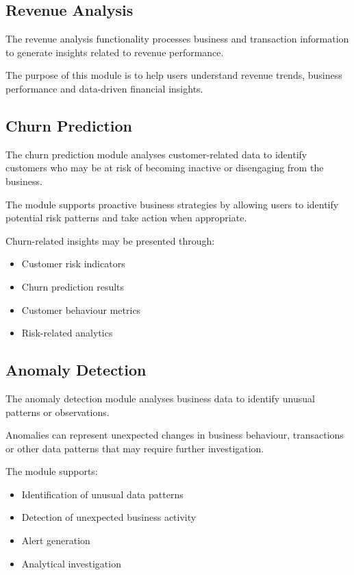 \documentclass[12pt,a4paper]{report}
\begin{document}
\subsection{Revenue Analysis}

The revenue analysis functionality processes business and transaction
information to generate insights related to revenue performance.

The purpose of this module is to help users understand revenue trends,
business performance and data-driven financial insights.


\subsection{Churn Prediction}

The churn prediction module analyses customer-related data to identify
customers who may be at risk of becoming inactive or disengaging from
the business.

The module supports proactive business strategies by allowing users to
identify potential risk patterns and take action when appropriate.

Churn-related insights may be presented through:

\begin{itemize}[leftmargin=1.2cm]
    \item Customer risk indicators
    \item Churn prediction results
    \item Customer behaviour metrics
    \item Risk-related analytics
\end{itemize}


\subsection{Anomaly Detection}

The anomaly detection module analyses business data to identify unusual
patterns or observations.

Anomalies can represent unexpected changes in business behaviour,
transactions or other data patterns that may require further
investigation.

The module supports:

\begin{itemize}[leftmargin=1.2cm]
    \item Identification of unusual data patterns
    \item Detection of unexpected business activity
    \item Alert generation
    \item Analytical investigation
\end{itemize}
\end{document}
